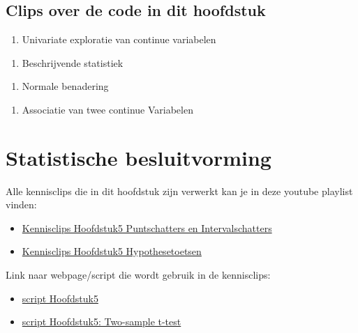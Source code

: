 \documentclass[
  12pt,dutch]{book}
\providecommand{\tightlist}{%
  \setlength{\itemsep}{0pt}\setlength{\parskip}{0pt}}
\theoremstyle{definition}
\theoremstyle{definition}
\theoremstyle{definition}
\theoremstyle{definition}
\theoremstyle{remark}
\begin{document}
\section{Clips over de code in dit hoofdstuk}\label{clips-over-de-code-in-dit-hoofdstuk}

\begin{enumerate}
\def\labelenumi{\arabic{enumi}.}
\tightlist
\item
  Univariate exploratie van continue variabelen
\end{enumerate}

\begin{enumerate}
\def\labelenumi{\arabic{enumi}.}
\setcounter{enumi}{1}
\tightlist
\item
  Beschrijvende statistiek
\end{enumerate}

\begin{enumerate}
\def\labelenumi{\arabic{enumi}.}
\setcounter{enumi}{2}
\tightlist
\item
  Normale benadering
\end{enumerate}

\begin{enumerate}
\def\labelenumi{\arabic{enumi}.}
\setcounter{enumi}{3}
\tightlist
\item
  Associatie van twee continue Variabelen
\end{enumerate}

\chapter{Statistische besluitvorming}\label{chap-besluit}

Alle kennisclips die in dit hoofdstuk zijn verwerkt kan je in deze youtube playlist vinden:

\begin{itemize}
\item
  \href{https://www.youtube.com/playlist?list=PLZH1hP8_LbJKyD9Jw5cqd-btYs11f9tkz}{Kennisclips Hoofdstuk5 Puntschatters en Intervalschatters}
\item
  \href{https://www.youtube.com/playlist?list=PLZH1hP8_LbJKEtDy2errIWf8hLJODw-jK}{Kennisclips Hoofdstuk5 Hypothesetoetsen}
\end{itemize}

Link naar webpage/script die wordt gebruik in de kennisclips:

\begin{itemize}
\item
  \href{https://statomics.github.io/sbc/rmd/05-statisticalInference.html}{script Hoofdstuk5}
\item
  \href{https://statomics.github.io/sbc/rmd/05-statisticalInference-twosampleT.html}{script Hoofdstuk5: Two-sample t-test}
\end{itemize}
\end{document}
